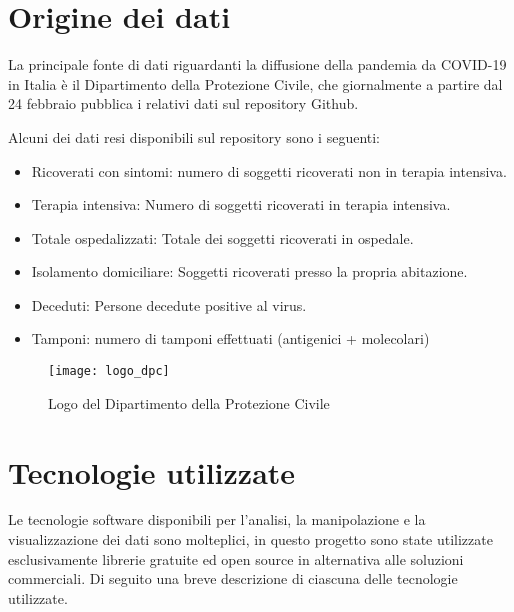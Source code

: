 
\section{Origine dei dati}
La principale fonte di dati riguardanti la diffusione della pandemia da COVID-19 in Italia è il Dipartimento della Protezione Civile, che giornalmente a partire dal 24 febbraio pubblica i relativi dati sul repository Github\cite{repository}.

Alcuni dei dati resi disponibili sul repository sono i seguenti:
\begin{itemize}
    \item Ricoverati con sintomi: numero di soggetti ricoverati non in terapia intensiva.
    \item Terapia intensiva: Numero di soggetti ricoverati in terapia intensiva.
    \item Totale ospedalizzati: Totale dei soggetti ricoverati in ospedale.
    \item Isolamento domiciliare: Soggetti ricoverati presso la propria abitazione.
    \item Deceduti: Persone decedute positive al virus.
    \item Tamponi: numero di tamponi effettuati (antigenici + molecolari)
\end{itemize}


\begin{figure}[htp]
    \centering
    \texttt{[image: logo\_dpc]}
    \caption{Logo del Dipartimento della Protezione Civile}
\end{figure}


\section{Tecnologie utilizzate}
Le tecnologie software disponibili per l'analisi, la manipolazione e la visualizzazione dei dati sono molteplici, in questo progetto sono state utilizzate esclusivamente librerie gratuite ed open source in alternativa alle soluzioni commerciali.
Di seguito una breve descrizione di ciascuna delle tecnologie utilizzate.

